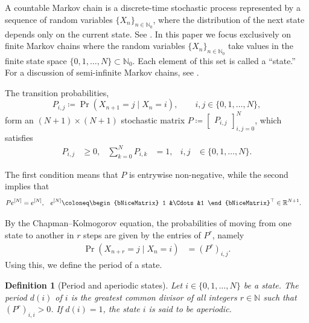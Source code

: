 \documentclass[11pt]{amsart}
\theoremstyle{plain}
\newtheorem{defi}[teo]{Definition}
\newcommand{\R}{\mathbb{R}}
\newcommand{\1}{\text{\fontseries{bx}\selectfont \textup 1}}
\begin{document}

A countable Markov chain is a discrete-time stochastic process represented by a sequence of random variables $\lbrace X_n\rbrace_{n\in\mathbb N_0}$, where the distribution of the next state depends only on the current state. See  \cite{gallager,feller}. In this paper we focus exclusively on finite Markov chains \cite{haggstrom,kirwood}
	where the random variables $\lbrace X_n\rbrace_{n\in\mathbb N_0}$ take values in the finite state space $\lbrace 0,1,\ldots,N\rbrace\subset\mathbb N_0$. Each element of this set is called a ``state.'' For a discussion of semi-infinite Markov chains, see \cite{JP,BFM5}.

The transition probabilities,
\[
P_{i,j}\coloneq \Pr(X_{n+1}=j\mid X_{n}=i),\qquad i,j\in\{0,1,\ldots,N\},
\]
form an $(N+1)\times (N+1)$ stochastic matrix $P\coloneq \left[ \begin{matrix} P_{i,j} \end{matrix} \right]_{i,j=0}^N$, which satisfies
\[
\begin{aligned}
	P_{i,j}&\geq0, &
	\sum_{k=0}^N P_{i,k}&=1, &
	i,j&\in\{0,1,\ldots,N\}.
\end{aligned}
\]

The first condition means that $P$ is entrywise non-negative, while the second implies that
\begin{align*}
	\begin{aligned}
		P e^{[N]}&=e^{[N]}, & e^{[N]}&\coloneq
		\begin{bNiceMatrix}
			1 &\Cdots &1
		\end{bNiceMatrix}^\top\in\R^{N+1}.
	\end{aligned}
\end{align*}

By the Chapman--Kolmogorov equation, the probabilities of moving from one state to another in $r$ steps are given by the entries of $P^r$, namely
\begin{align*}
	\Pr(X_{n+r}=j\mid X_{n}=i)&=(P^r)_{i,j}.
\end{align*}
Using this, we define the period of a state.

\begin{defi}[Period and aperiodic states]
	\label{defperiodo}
	Let $i\in\{0,1,\ldots,N\}$ be a state. The {period} $d(i)$ of $i$ is the greatest common divisor of all integers $r\in\mathbb N$ such that $(P^r)_{i,i}>0$. If $d(i)=1$, the state $i$ is said to be {aperiodic}.
\end{defi}
\end{document}
